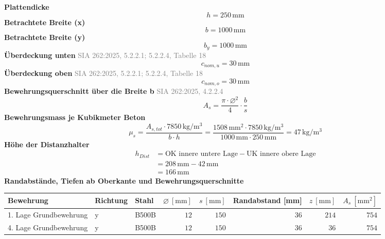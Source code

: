 \documentclass[11pt,a4paper]{article}
\newcommand{\normref}[1]{{\small\textcolor{gray}{#1}}}
\begin{document}
\noindent\textbf{Plattendicke}
\begin{equation*}
h = 250\,\mathrm{mm}
\end{equation*}
\noindent\textbf{Betrachtete Breite (x)}
\begin{equation*}
b = 1000\,\mathrm{mm}
\end{equation*}
\noindent\textbf{Betrachtete Breite (y)}
\begin{equation*}
b_y = 1000\,\mathrm{mm}
\end{equation*}
\noindent\textbf{Überdeckung unten} \hfill \normref{SIA 262:2025, 5.2.2.1; 5.2.2.4, Tabelle 18}
\begin{equation*}
c_{nom,u} = 30\,\mathrm{mm}
\end{equation*}
\noindent\textbf{Überdeckung oben} \hfill \normref{SIA 262:2025, 5.2.2.1; 5.2.2.4, Tabelle 18}
\begin{equation*}
c_{nom,o} = 30\,\mathrm{mm}
\end{equation*}
\noindent\textbf{Bewehrungsquerschnitt über die Breite b} \hfill \normref{SIA 262:2025, 4.2.2.4}
\begin{equation*}
A_s = \frac{\pi \cdot \varnothing^{2}}{4} \cdot \frac{b}{s}
\end{equation*}
\noindent\textbf{Bewehrungsmass je Kubikmeter Beton}
\begin{equation*}
\mu_s = \frac{A_{s,tot} \cdot 7850\,\mathrm{kg}/\mathrm{m}^{3}}{b \cdot h} = \frac{1508\,\mathrm{mm}^{2} \cdot 7850\,\mathrm{kg}/\mathrm{m}^{3}}{1000\,\mathrm{mm} \cdot 250\,\mathrm{mm}} = 47\,\mathrm{kg}/\mathrm{m}^{3}
\end{equation*}
\noindent\textbf{Höhe der Distanzhalter}
\begin{equation*}
\begin{aligned}
  h_{Dist} &= \text{OK innere untere Lage} - \text{UK innere obere Lage} \\
  &= 208\,\mathrm{mm} - 42\,\mathrm{mm} \\
  &= 166\,\mathrm{mm}
\end{aligned}
\end{equation*}
\noindent\textbf{Randabstände, Tiefen ab Oberkante und Bewehrungsquerschnitte}
\begin{longtable}{lllrrrrr}
\hline
Bewehrung & Richtung & Stahl & $\varnothing\ [\mathrm{mm}]$ & $s\ [\mathrm{mm}]$ & Randabstand [mm] & $z\ [\mathrm{mm}]$ & $A_s\ [\mathrm{mm}^2]$ \\
\hline
\endhead
1. Lage Grundbewehrung & y & B500B & $12$ & $150$ & $36$ & $214$ & $754$ \\
4. Lage Grundbewehrung & y & B500B & $12$ & $150$ & $36$ & $36$ & $754$ \\
\hline
\end{longtable}
\end{document}
